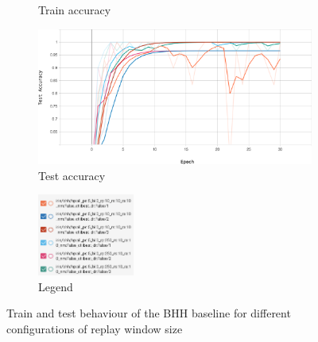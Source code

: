 \begin{figure}[htbp]
\begin{subfigure}{0.49\textwidth}
        \caption{Train accuracy}
        \label{fig:results:case_study:iris:train:accuracy}
    \end{subfigure}
    \begin{subfigure}{0.49\textwidth}
    	\centering
        \includegraphics[width=\textwidth]{analysis/bhh_case_study/iris/test_accuracy.png}
        \caption{Test accuracy}
        \label{fig:results:case_study:iris:test:accuracy}
    \end{subfigure}
    \par\bigskip
    \begin{subfigure}{\textwidth}
    	\centering
        \includegraphics[width=0.35\textwidth]{analysis/bhh_case_study/iris/legend.png}
        \caption{Legend}
        \label{fig:results:case_study:iris:legend}
    \end{subfigure}
    \par\bigskip
    \caption{Train and test behaviour of the \Ac{BHH} baseline for different configurations of replay window size}
    \label{fig:results:case_study:iris:metric_plots}
\end{figure}

